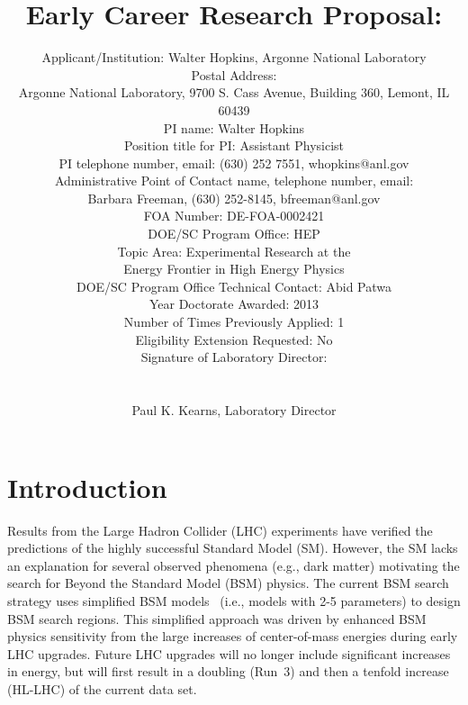 \documentclass[letter, USenglish, 11pt, subfigure]{article}
\title{Early Career Research Proposal: \\}
\author{Applicant/Institution: Walter Hopkins, Argonne National Laboratory\\ Postal Address: \\Argonne National Laboratory, 9700 S. Cass Avenue, Building 360, Lemont, IL 60439
  \\PI name: Walter Hopkins\\Position title for PI: Assistant Physicist\\PI telephone number, email: (630) 252 7551, whopkins@anl.gov\\Administrative Point of Contact name, telephone number, email:\\Barbara Freeman, (630) 252-8145, bfreeman@anl.gov\\FOA Number: DE-FOA-0002421\\DOE/SC Program Office: HEP\\ Topic Area: Experimental Research at the \\Energy Frontier in High Energy Physics\\DOE/SC Program Office Technical Contact: Abid Patwa\\Year Doctorate Awarded: 2013\\Number of Times Previously Applied: 1\\Eligibility Extension Requested: No\\Signature of Laboratory Director: \\ \\ \\Paul K. Kearns, Laboratory Director
}
\date{}
\begin{document}
%

\clearpage
\tableofcontents
\clearpage
{} 



\section{Introduction}

Results from the Large Hadron Collider (LHC) experiments have verified the predictions of the highly successful Standard Model (SM). However, the SM  lacks an explanation for several observed phenomena (e.g., dark matter) motivating the search for Beyond the Standard Model (BSM) physics. The current BSM search strategy uses simplified BSM models~\cite{simpModels} (i.e., models with 2-5 parameters) to design BSM search regions. This simplified approach was driven by enhanced BSM physics sensitivity from the large increases of center-of-mass energies during early LHC upgrades. Future LHC upgrades will no longer include significant increases in energy, but will first result in a doubling (Run~3) and then a tenfold increase (HL-LHC) of the current data set.
\end{document}
